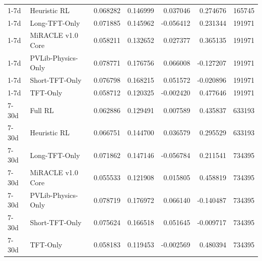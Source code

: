 \begin{tabular}{llrrrrr}
1-7d & Heuristic RL & 0.068282 & 0.146999 & 0.037046 & 0.274676 & 165745 \\
1-7d & Long-TFT-Only & 0.071885 & 0.145962 & -0.056412 & 0.231344 & 191971 \\
1-7d & MiRACLE v1.0 Core & 0.058211 & 0.132652 & 0.027377 & 0.365135 & 191971 \\
1-7d & PVLib-Physics-Only & 0.078771 & 0.176756 & 0.066008 & -0.127207 & 191971 \\
1-7d & Short-TFT-Only & 0.076798 & 0.168215 & 0.051572 & -0.020896 & 191971 \\
1-7d & TFT-Only & 0.058712 & 0.120325 & -0.002420 & 0.477646 & 191971 \\
7-30d & Full RL & 0.062886 & 0.129491 & 0.007589 & 0.435837 & 633193 \\
7-30d & Heuristic RL & 0.066751 & 0.144700 & 0.036579 & 0.295529 & 633193 \\
7-30d & Long-TFT-Only & 0.071862 & 0.147146 & -0.056784 & 0.211541 & 734395 \\
7-30d & MiRACLE v1.0 Core & 0.055533 & 0.121908 & 0.015805 & 0.458819 & 734395 \\
7-30d & PVLib-Physics-Only & 0.078719 & 0.176972 & 0.066140 & -0.140487 & 734395 \\
7-30d & Short-TFT-Only & 0.075624 & 0.166518 & 0.051645 & -0.009717 & 734395 \\
7-30d & TFT-Only & 0.058183 & 0.119453 & -0.002569 & 0.480394 & 734395 \\
\bottomrule
\end{tabular}
